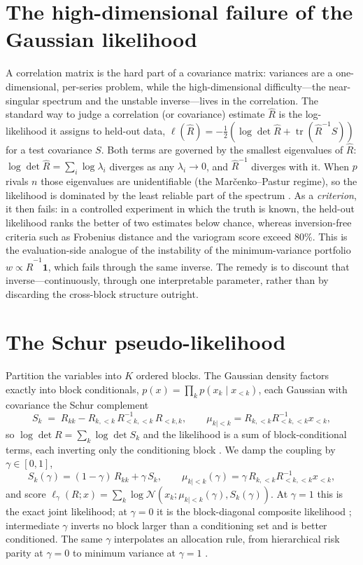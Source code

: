 \documentclass[11pt]{article}
\newcommand{\Rhat}{\widehat{R}}
\newcommand{\tr}{\operatorname{tr}}
\newcommand{\logdet}{\log\det}
\begin{document}
\section{The high-dimensional failure of the Gaussian likelihood}
A correlation matrix is the hard part of a covariance matrix: variances are a one-dimensional,
per-series problem, while the high-dimensional difficulty---the near-singular spectrum and the unstable
inverse---lives in the correlation. The standard way to judge a correlation (or covariance) estimate
$\Rhat$ is the log-likelihood it assigns to held-out data,
$\ell(\Rhat) = -\tfrac12(\logdet\Rhat + \tr(\Rhat^{-1}S))$ for a test covariance $S$. Both terms are
governed by the smallest eigenvalues of $\Rhat$: $\logdet\Rhat=\sum_i\log\lambda_i$ diverges as any
$\lambda_i\to0$, and $\Rhat^{-1}$ diverges with it. When $p$ rivals $n$ those eigenvalues are
unidentifiable (the Mar\v{c}enko--Pastur regime), so the likelihood is dominated by the least reliable
part of the spectrum \citep{ledoit2004,bun2017}. As a \emph{criterion}, it then fails: in a controlled
experiment in which the truth is known, the held-out likelihood ranks the better of two estimates below
chance, whereas inversion-free criteria such as Frobenius distance and the variogram score
\citep{scheuerer2015} exceed $80\%$. This is the evaluation-side analogue of the instability of the
minimum-variance portfolio $w\propto\Rhat^{-1}\mathbf1$, which fails through the same inverse. The
remedy is to discount that inverse---continuously, through one interpretable parameter, rather than by
discarding the cross-block structure outright.

\section{The Schur pseudo-likelihood}
Partition the variables into $K$ ordered blocks. The Gaussian density factors exactly into block
conditionals, $p(x)=\prod_k p(x_k\mid x_{<k})$, each Gaussian with covariance the Schur complement
\[
  S_k \;=\; R_{kk} - R_{k,<k}\,R_{<k,<k}^{-1}\,R_{<k,k},
  \qquad
  \mu_{k\mid<k} = R_{k,<k}R_{<k,<k}^{-1}x_{<k},
\]
so $\logdet R=\sum_k\logdet S_k$ and the likelihood is a sum of block-conditional terms, each inverting
only the conditioning block \citep{vecchia1988,katzfuss2021}. We damp the coupling by $\gamma\in[0,1]$,
\[
  S_k(\gamma) = (1-\gamma)\,R_{kk} + \gamma\,S_k,
  \qquad
  \mu_{k\mid<k}(\gamma) = \gamma\,R_{k,<k}R_{<k,<k}^{-1}x_{<k},
\]
and score $\ell_\gamma(R;x)=\sum_k\log\mathcal N(x_k;\mu_{k\mid<k}(\gamma),S_k(\gamma))$. At $\gamma=1$
this is the exact joint likelihood; at $\gamma=0$ it is the block-diagonal composite likelihood
\citep{besag1975,lindsay1988,varin2011}; intermediate $\gamma$ inverts no block larger than a
conditioning set and is better conditioned. The same $\gamma$ interpolates an allocation rule, from
hierarchical risk parity at $\gamma=0$ \citep{lopezdeprado2016} to minimum variance at $\gamma=1$
\citep{cotton2024}.
\end{document}
